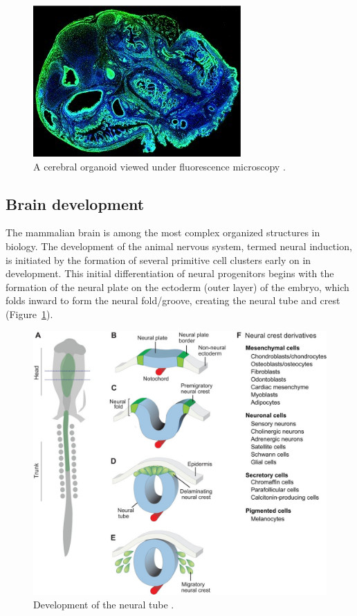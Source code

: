 \documentclass[12pt,oneside,onecolumn,a4paper]{article}
\begin{document}
\begin{figure}[h!]
\begin{center}
\includegraphics[width=0.8\columnwidth]{figures/cerebral_organoid/cerebral-organoid-for-Broad-web-300x218}
\caption{A cerebral organoid viewed under fluorescence microscopy \citep{nguyen_wang_nikolakopoulou_2015}.%
}
\end{center}
\end{figure}

\subsection{Brain development}

The mammalian brain is among the most complex organized structures in biology. The development of the animal nervous system, termed neural induction, is initiated by the formation of several primitive cell clusters early on in development. This initial differentiation of neural progenitors begins with the formation of the neural plate on the ectoderm (outer layer) of the embryo, which folds inward to form the neural fold/groove, creating the neural tube and crest (Figure~\ref{fig:development}). 

\begin{figure}[h!]
\begin{center}
\includegraphics[width=0.8\columnwidth]{figures/brain_development}
\caption{Development of the neural tube \citep{neural_development}. \label{fig:development}%
}
\end{center}
\end{figure}
\end{document}
